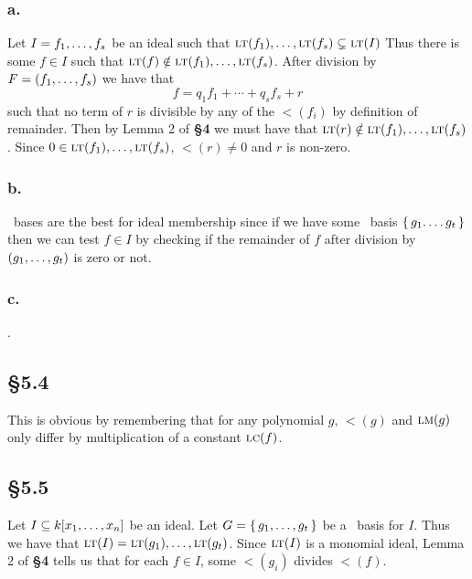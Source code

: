 \documentclass[letterpaper]{article}
\begin{document}
\subsubsection*{a.}

Let $I = \gen{f_{1}, \ldots, f_{s}}$ be an ideal such that $\gen{\lt(f_{1}), \ldots, \lt(f_{s})} \subsetneq \gen{\lt(I)}$ Thus there is some $f \in I$ such that $\lt(f) \notin \gen{\lt(f_{1}), \ldots, \lt(f_{s})}$.
After division by $F = \pqty{f_{1}, \ldots, f_{s}}$ we have that
\[
  f = q_{1}f_{1} + \cdots + q_{s}f_{s} + r
\]
such that no term of $r$ is divisible by any of the $\lt(f_{i})$ by definition of remainder.
Then by Lemma 2 of \textbf{\S 4} we must have that $\lt(r) \notin \gen{\lt(f_{1}), \ldots, \lt(f_{s})}$.
Since $0 \in \gen{\lt(f_{1}), \ldots, \lt(f_{s})}$, $\lt(r) \neq 0$ and $r$ is non-zero.

\subsubsection*{b.}

\Grobner\ bases are the best for ideal membership since if we have some \Grobner\ basis $\set{g_{1}.
\ldots g_{t}}$ then we can test $f \in I$ by checking if the remainder of $f$ after division by $\pqty{g_{1}, \ldots, g_{t}}$ is zero or not.

\subsubsection*{c.}

.

\clearpage

\subsection*{\S 5.4}

This is obvious by remembering that for any polynomial $g$, $\lt(g)$ and $\operatorname{\textsc{lm}}(g)$ only differ by multiplication of a constant $\operatorname{\textsc{lc}}(f)$.

\subsection*{\S 5.5}

Let $I \subseteq k\bqty{x_{1}, \ldots, x_{n}}$ be an ideal.
Let $G = \set{g_{1}, \ldots, g_{t}}$ be a \Grobner\ basis for $I$.
Thus we have that $\gen{\lt(I)} = \gen{\lt(g_{1}), \ldots, \lt(g_{t})}$.
Since $\gen{\lt(I)}$ is a monomial ideal, Lemma 2 of \textbf{\S 4} tells us that for each $f \in I$, some $\lt(g_{i})$ divides $\lt(f)$.
\end{document}
